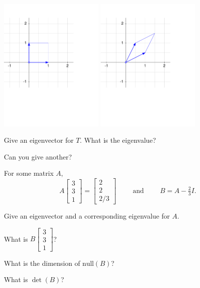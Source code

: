 \documentclass{problemset}
\newcommand{\mat}[1]{\begin{bmatrix}#1\end{bmatrix}}
\begin{document}
	\vspace{-1cm}
	\begin{center}
	\includegraphics[width=2in]{images/transform1b.pdf}
	\includegraphics[width=2in]{images/transform2b.pdf}
	\end{center}
	\vspace{-2.5cm}

	\begin{parts}
		\item Give an eigenvector for $T$.  What is the eigenvalue?
		\item Can you give another?
	\end{parts}


	\question
	For some matrix $A$,
	\vspace{-.2cm}
	\[
		A\mat{3\\3\\1}=\mat{2\\2\\2/3}\qquad\text{ and }\qquad B=A-\tfrac{2}{3}I.
	\]
	\vspace{-.4cm}
	\begin{parts}
		\item Give an eigenvector and a corresponding eigenvalue for $A$.
		\item What is $B\mat{3\\3\\1}$?
		\item What is the dimension of $\text{null}(B)$?
		\item What is $\det(B)$?
	\end{parts}
\end{document}
